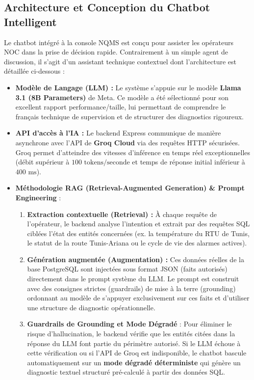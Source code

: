 \documentclass[11pt,a4paper]{article}
\begin{document}
\subsection{Architecture et Conception du Chatbot Intelligent}
Le chatbot intégré à la console NQMS est conçu pour assister les opérateurs NOC dans la prise de décision rapide. Contrairement à un simple agent de discussion, il s'agit d'un assistant technique contextuel dont l'architecture est détaillée ci-dessous :
\begin{itemize}
    \item \textbf{Modèle de Langage (LLM) :} Le système s'appuie sur le modèle \textbf{Llama 3.1 (8B Parameters)} de Meta. Ce modèle a été sélectionné pour son excellent rapport performance/taille, lui permettant de comprendre le français technique de supervision et de structurer des diagnostics rigoureux.
    \item \textbf{API d'accès à l'IA :} Le backend Express communique de manière asynchrone avec l'API de \textbf{Groq Cloud} via des requêtes HTTP sécurisées. Groq permet d'atteindre des vitesses d'inférence en temps réel exceptionnelles (débit supérieur à $100 \text{ tokens/seconde}$ et temps de réponse initial inférieur à $400\text{ ms}$).
    \item \textbf{Méthodologie RAG (Retrieval-Augmented Generation) \& Prompt Engineering} :
    \begin{enumerate}
        \item \textbf{Extraction contextuelle (Retrieval) :} À chaque requête de l'opérateur, le backend analyse l'intention et extrait par des requêtes SQL ciblées l'état des entités concernées (ex. la température du RTU de Tunis, le statut de la route Tunis-Ariana ou le cycle de vie des alarmes actives).
        \item \textbf{Génération augmentée (Augmentation) :} Ces données réelles de la base PostgreSQL sont injectées sous format JSON (faits autorisés) directement dans le prompt système du LLM. Le prompt est construit avec des consignes strictes (guardrails) de mise à la terre (grounding) ordonnant au modèle de s'appuyer exclusivement sur ces faits et d'utiliser une structure de diagnostic opérationnelle.
        \item \textbf{Guardrails de Grounding et Mode Dégradé} : Pour éliminer le risque d'hallucination, le backend vérifie que les entités citées dans la réponse du LLM font partie du périmètre autorisé. Si le LLM échoue à cette vérification ou si l'API de Groq est indisponible, le chatbot bascule automatiquement sur un \textbf{mode dégradé déterministe} qui génère un diagnostic textuel structuré pré-calculé à partir des données SQL.
    \end{enumerate}
\end{itemize}
\end{document}
